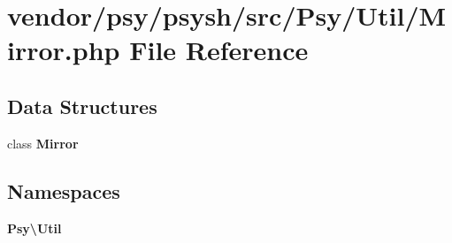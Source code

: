 \section{vendor/psy/psysh/src/\+Psy/\+Util/\+Mirror.php File Reference}
\label{_mirror_8php}
\subsection*{Data Structures}
\begin{DoxyCompactItemize}
\item 
class {\bf Mirror}
\end{DoxyCompactItemize}
\subsection*{Namespaces}
\begin{DoxyCompactItemize}
\item 
 {\bf Psy\textbackslash{}\+Util}
\end{DoxyCompactItemize}
